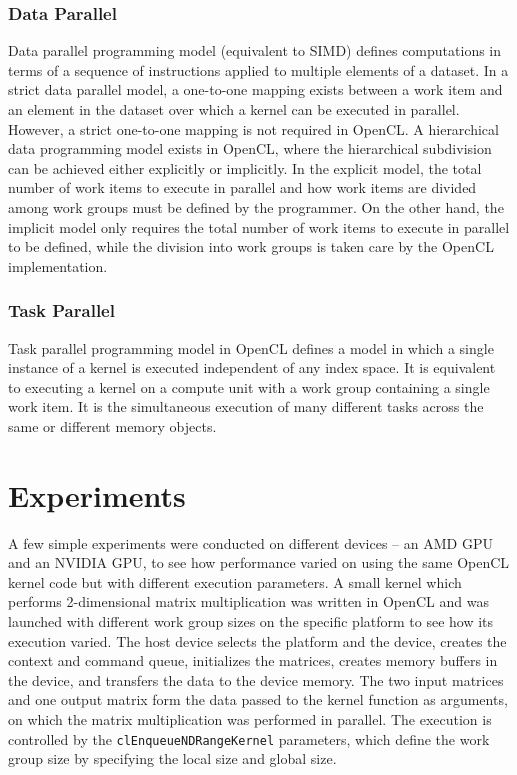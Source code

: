 \subsubsection{Data Parallel}
Data parallel programming model (equivalent to SIMD) defines computations in terms of a sequence of instructions applied to multiple elements of a dataset. In a strict data parallel model, a one-to-one mapping exists between a work item and an element in the dataset over which a kernel can be executed in parallel. However, a strict one-to-one mapping is not required in OpenCL. \newline\newline
A hierarchical data programming model exists in OpenCL, where the hierarchical subdivision can be achieved either explicitly or implicitly. In the explicit model, the total number of work items to execute in parallel and how work items are divided among work groups must be defined by the programmer. On the other hand, the implicit model only requires the total number of work items to execute in parallel to be defined, while the division into work groups is taken care by the OpenCL implementation.

\subsubsection{Task Parallel}
Task parallel programming model in OpenCL defines a model in which a single instance of a kernel is executed independent of any index space. It is equivalent to executing a kernel on a compute unit with a work group containing a single work item. It is the simultaneous execution of many different tasks across the same or different memory objects.

\section{Experiments}
A few simple experiments were conducted on different devices – an AMD GPU and an NVIDIA GPU, to see how performance varied on using the same OpenCL kernel code but with different execution parameters. A small kernel which performs 2-dimensional matrix multiplication was written in OpenCL and was launched with different work group sizes on the specific platform to see how its execution varied. \newline\newline
The host device selects the platform and the device, creates the context and command queue, initializes the matrices, creates memory buffers in the device, and transfers the data to the device memory. The two input matrices and one output matrix form the data passed to the kernel function as arguments, on which the matrix multiplication was performed in parallel. The execution is controlled by the \verb|clEnqueueNDRangeKernel| parameters, which define the work group size by specifying the local size and global size. \newline\newline

